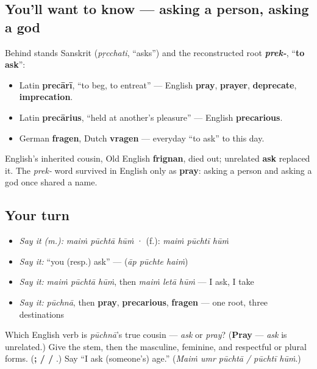 \subsection*{You'll want to know — asking a person, asking a god}
Behind \textbf{} stands Sanskrit \textbf{} (\emph{pṛcchati}, \textquotedblleft{}asks\textquotedblright{}) and the reconstructed root \emph{\textbf{prek-}}, \textquotedblleft{}\textbf{to ask}\textquotedblright{}:

\begin{itemize}
\raggedright
  \item Latin \textbf{precārī}, \textquotedblleft{}to beg, to entreat\textquotedblright{} — English \textbf{pray}, \textbf{prayer}, \textbf{deprecate}, \textbf{imprecation}.
  \item Latin \textbf{precārius}, \textquotedblleft{}held at another's pleasure\textquotedblright{} — English \textbf{precarious}.
  \item German \textbf{fragen}, Dutch \textbf{vragen} — everyday \textquotedblleft{}to ask\textquotedblright{} to this day.
\end{itemize}

English's inherited cousin, Old English \textbf{frignan}, died out; unrelated \textbf{ask} replaced it. The \emph{prek-} word survived in English only as \textbf{pray}: asking a person and asking a god once shared a name.

\subsection*{Your turn}
\begin{itemize}
\raggedright
  \item \emph{Say it (m.):} \emph{maiṁ pūchtā hūṁ}  ·  (f.): \emph{maiṁ pūchtī hūṁ}
  \item \emph{Say it:} \textquotedblleft{}you (resp.) ask\textquotedblright{} — \textbf{  } (\emph{āp pūchte haiṁ})
  \item \emph{Say it:} \emph{maiṁ pūchtā hūṁ}, then \emph{maiṁ letā hūṁ} — I ask, I take
  \item \emph{Say it:} \emph{pūchnā}, then \textbf{pray}, \textbf{precarious}, \textbf{fragen} — one root, three destinations
\end{itemize}

\begin{tcolorbox}[breakable,colback=teal!4,colframe=teal!35!black,title={Before you move on}]
Which English verb is \emph{pūchnā}'s true cousin — \emph{ask} or \emph{pray}? (\textbf{Pray} — \emph{ask} is unrelated.) Give the stem, then the masculine, feminine, and respectful or plural forms. (\textbf{;  /  / }.) Say \textquotedblleft{}I ask (someone's) age.\textquotedblright{} (\emph{Maiṁ umr pūchtā / pūchtī hūṁ}.)
\end{tcolorbox}
